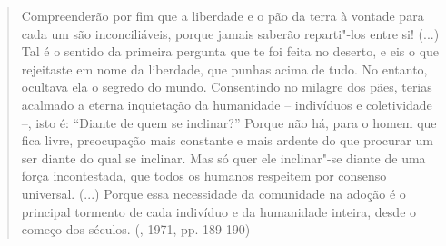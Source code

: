 {\begin{quote}
Compreenderão por fim que a liberdade e o pão da terra à vontade para
cada um são inconciliáveis, porque jamais saberão reparti"-los entre si!
(...) Tal é o sentido da primeira pergunta que te foi feita no deserto,
e eis o que rejeitaste em nome da liberdade, que punhas acima de tudo.
No entanto, ocultava ela o segredo do mundo. Consentindo no milagre dos
pães, terias acalmado a eterna inquietação da humanidade -- indivíduos e
coletividade --, isto é: ``Diante de quem se inclinar?'' Porque não há,
para o homem que fica livre, preocupação mais constante e mais ardente
do que procurar um ser diante do qual se inclinar. Mas só quer ele
inclinar"-se diante de uma força incontestada, que todos os humanos
respeitem por consenso universal. (...) Porque essa necessidade da
comunidade na adoção é o principal tormento de cada indivíduo e da
humanidade inteira, desde o começo dos séculos. (, 1971, pp.
189-190)


\end{quote}}
